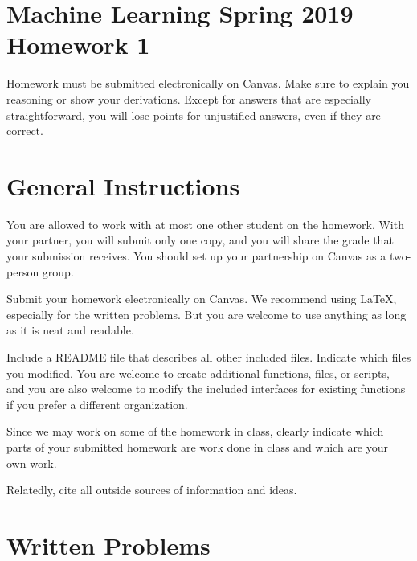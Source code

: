 \documentclass[10pt]{article}
\begin{document}
\section*{Machine Learning Spring 2019 Homework 1}

Homework must be submitted electronically on Canvas. Make sure to explain you reasoning or show your derivations. Except for answers that are especially straightforward, you will lose points for unjustified answers, even if they are correct. 

\section*{General Instructions}

You are allowed to work with at most one other student on the homework. With your partner, you will submit only one copy, and you will share the grade that your submission receives. You should set up your partnership on Canvas as a two-person group. 

Submit your homework electronically on Canvas. We recommend using LaTeX, especially for the written problems. But you are welcome to use anything as long as it is neat and readable. 

Include a README file that describes all other included files. Indicate which files you modified. You are welcome to create additional functions, files, or scripts, and you are also welcome to modify the included interfaces for existing functions if you prefer a different organization. 

Since we may work on some of the homework in class, clearly indicate which parts of your submitted homework are work done in class and which are your own work. 

Relatedly, cite all outside sources of information and ideas. 

\section*{Written Problems}
\end{document}
